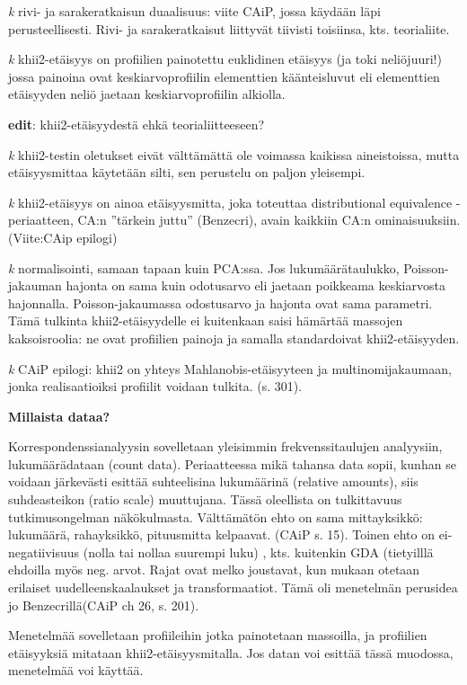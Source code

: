 \documentclass[
  finnish,
]{book}
\begin{document}
\emph{k} rivi- ja sarakeratkaisun duaalisuus: viite CAiP, jossa käydään läpi
perusteellisesti. Rivi- ja sarakeratkaisut liittyvät tiivisti toisiinsa, kts.
teorialiite.

\emph{k} khii2-etäisyys on profiilien painotettu euklidinen etäisyys (ja toki
neliöjuuri!) jossa painoina ovat keskiarvoprofiilin elementtien käänteisluvut
eli elementtien etäisyyden neliö jaetaan keskiarvoprofiilin alkiolla.

\textbf{edit}: khii2-etäisyydestä ehkä teorialiitteeseen?

\emph{k} khii2-testin oletukset eivät välttämättä ole voimassa kaikissa aineistoissa,
mutta etäisyysmittaa käytetään silti, sen perustelu on paljon yleisempi.

\emph{k} khii2-etäisyys on ainoa etäisyysmitta, joka toteuttaa distributional
equivalence - periaatteen, CA:n ''tärkein juttu'' (Benzecri), avain kaikkiin CA:n
ominaisuuksiin. (Viite:CAip epilogi)

\emph{k} normalisointi, samaan tapaan kuin PCA:ssa. Jos lukumäärätaulukko,
Poisson-jakauman hajonta on sama kuin odotusarvo eli jaetaan poikkeama
keskiarvosta hajonnalla. Poisson-jakaumassa odostusarvo ja hajonta ovat sama
parametri. Tämä tulkinta khii2-etäisyydelle ei kuitenkaan saisi hämärtää massojen
kaksoisroolia: ne ovat profiilien painoja ja samalla standardoivat khii2-etäisyyden.

\emph{k} CAiP epilogi: khii2 on yhteys Mahlanobis-etäisyyteen ja multinomijakaumaan,
jonka realisaatioiksi profiilit voidaan tulkita. (s. 301).

\textbf{Millaista dataa?}

Korrespondenssianalyysin sovelletaan yleisimmin frekvenssitaulujen analyysiin,
lukumäärädataan (count data). Periaatteessa mikä tahansa data sopii, kunhan se
voidaan järkevästi esittää suhteelisina lukumäärinä (relative amounts), siis
suhdeasteikon (ratio scale) muuttujana. Tässä oleellista on tulkittavuus
tutkimusongelman näkökulmasta. Välttämätön ehto on sama mittayksikkö: lukumäärä,
rahayksikkö, pituusmitta kelpaavat. (CAiP s. 15).
Toinen ehto on ei-negatiivisuus (nolla tai nollaa suurempi luku) ,
kts. kuitenkin GDA (tietyilllä ehdoilla myös neg. arvot. Rajat ovat melko
joustavat, kun mukaan otetaan erilaiset uudelleenskaalaukset ja transformaatiot.
Tämä oli menetelmän perusidea jo Benzecrillä(CAiP ch 26, s. 201).

Menetelmää sovelletaan profiileihin jotka painotetaan massoilla, ja
profiilien etäisyyksiä mitataan khii2-etäisyysmitalla. Jos datan voi esittää
tässä muodossa, menetelmää voi käyttää.
\end{document}
